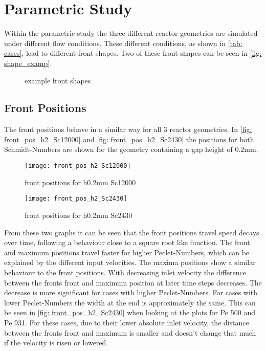 \documentclass[../thesis.tex]{subfiles}
\begin{document}
\chapter{Parametric Study}
\label{chp: para_stud}
Within the parametric study the three different reactor geometries are simulated under different flow conditions. These different conditions, as shown in \autoref{tab: cases}, lead to different front shapes. Two of these front shapes can be seen in \autoref{fig: shape_examp}.
\begin{figure}[htb]
	\centering
	\qquad
	\caption{example front shapes}%
	\label{fig: shape_examp}%
\end{figure}

\section{Front Positions}

The front positions behave in a similar way for all 3 reactor geometries. In \autoref{fig: front_pos_h2_Sc12000} and \autoref{fig: front_pos_h2_Sc2430} the positions for both Schmidt-Numbers are shown for the geometry containing a gap height of 0.2mm.
\begin{figure}[htbp]
	\centering
	\texttt{[image: front\_pos\_h2\_Sc12000]}
	\caption{front positions for h0.2mm Sc12000\label{fig: front_pos_h2_Sc12000}}\bigskip
	\texttt{[image: front\_pos\_h2\_Sc2430]}
	\caption{front positions for h0.2mm Sc2430\label{fig: front_pos_h2_Sc2430}}
\end{figure}

From these two graphs it can be seen that the front positions travel speed decays over time, following a behaviour close to a  square root like function. The front and maximum positions travel faster for higher Peclet-Numbers, which can be explained by the different input velocities. The maxima positions show a similar behaviour to the front positions. 
With decreasing inlet velocity the difference between the fronts front and maximum position at later time steps decreases. The decrease is more significant for cases with higher Peclet-Numbers. For cases with lower Peclet-Numbers the width at the end is approximately the same. This can be seen in \autoref{fig: front_pos_h2_Sc2430} when looking at the plots for Pe 500 and Pe 931. For these cases, due to their lower absolute inlet velocity, the distance between the fronts front and maximum is smaller and doesn't change that much if the velocity is risen or lowered.
\end{document}
